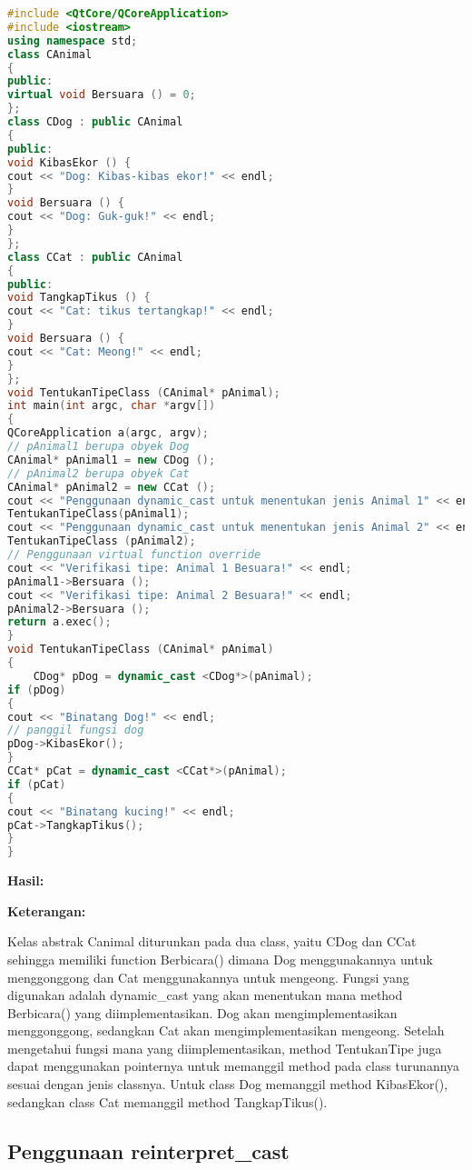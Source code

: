 \begin{lstlisting}[language=c++, caption=Contoh Dynamic Casting]
#include <QtCore/QCoreApplication>
#include <iostream>
using namespace std;
class CAnimal
{
public:
virtual void Bersuara () = 0;
};
class CDog : public CAnimal
{
public:
void KibasEkor () {
cout << "Dog: Kibas-kibas ekor!" << endl;
}
void Bersuara () {
cout << "Dog: Guk-guk!" << endl;
}
};
class CCat : public CAnimal
{
public:
void TangkapTikus () {
cout << "Cat: tikus tertangkap!" << endl;
}
void Bersuara () {
cout << "Cat: Meong!" << endl;
}
};
void TentukanTipeClass (CAnimal* pAnimal);
int main(int argc, char *argv[])
{
QCoreApplication a(argc, argv);
// pAnimal1 berupa obyek Dog
CAnimal* pAnimal1 = new CDog ();
// pAnimal2 berupa obyek Cat
CAnimal* pAnimal2 = new CCat ();
cout << "Penggunaan dynamic_cast untuk menentukan jenis Animal 1" << endl;
TentukanTipeClass(pAnimal1);
cout << "Penggunaan dynamic_cast untuk menentukan jenis Animal 2" << endl;
TentukanTipeClass (pAnimal2);
// Penggunaan virtual function override
cout << "Verifikasi tipe: Animal 1 Besuara!" << endl;
pAnimal1->Bersuara ();
cout << "Verifikasi tipe: Animal 2 Besuara!" << endl;
pAnimal2->Bersuara ();
return a.exec();
}
void TentukanTipeClass (CAnimal* pAnimal)
{
    CDog* pDog = dynamic_cast <CDog*>(pAnimal);
if (pDog)
{
cout << "Binatang Dog!" << endl;
// panggil fungsi dog
pDog->KibasEkor();
}
CCat* pCat = dynamic_cast <CCat*>(pAnimal);
if (pCat)
{
cout << "Binatang kucing!" << endl;
pCat->TangkapTikus();
}
}
\end{lstlisting}

\textbf{Hasil:}

\textbf{Keterangan:}

Kelas abstrak Canimal diturunkan pada dua class, yaitu CDog dan CCat
sehingga memiliki function Berbicara() dimana Dog menggunakannya untuk
menggonggong dan Cat menggunakannya untuk mengeong. Fungsi yang
digunakan adalah dynamic\_cast yang akan menentukan mana method
Berbicara() yang diimplementasikan. Dog akan mengimplementasikan
menggonggong, sedangkan Cat akan mengimplementasikan mengeong. Setelah
mengetahui fungsi mana yang diimplementasikan, method TentukanTipe juga
dapat menggunakan pointernya untuk memanggil method pada class
turunannya sesuai dengan jenis classnya. Untuk class Dog memanggil
method KibasEkor(), sedangkan class Cat memanggil method TangkapTikus().

\subsection{Penggunaan
reinterpret\_cast}\label{penggunaan-reinterpretux5fcast}

